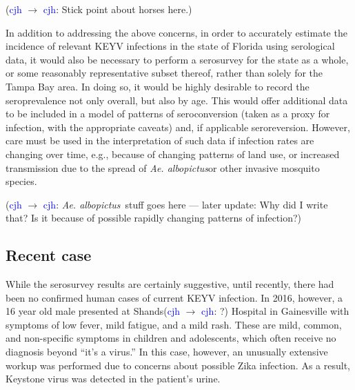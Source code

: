\documentclass[12pt]{article}
\newcommand{\alb}{\textit{Ae. albopictus}}
\newcommand{\cjh}{\textcolor{blue}{cjh}}
\newcommand{\msg}[3]{(#1 $\rightarrow$ #2: #3)}
\newcommand{\mcc}[1]{\msg\cjh\cjh{#1}}
\begin{document}
        \mcc{Stick point about horses here.}

        In addition to addressing the above concerns, in order to accurately estimate the incidence of relevant KEYV infections in the state of Florida using serological data, it would also be necessary to perform a serosurvey for the state as a whole, or some reasonably representative subset thereof, rather than solely for the Tampa Bay area. In doing so, it would be highly desirable to record the seroprevalence not only overall, but also by age. This would offer additional data to be included in a model of patterns of seroconversion (taken as a proxy for infection, with the appropriate caveats) and, if applicable seroreversion. However, care must be used in the interpretation of such data if infection rates are changing over time, e.g., because of changing patterns of land use, or increased transmission due to the spread of \alb or other invasive mosquito species.

        \mcc{\alb\ stuff goes here --- later update: Why did I write that? Is it because of possible rapidly changing patterns of infection?}

        \subsection{Recent case}
            While the serosurvey results are certainly suggestive, until recently, there had been no confirmed human cases of current KEYV infection. In 2016, however, a 16 year old male presented at Shands\mcc{?} Hospital in Gainesville with symptoms of low fever, mild fatigue, and a mild rash. These are mild, common, and non-specific symptoms in children and adolescents, which often receive no diagnosis beyond ``it's a virus.'' In this case, however, an unusually extensive workup was performed due to concerns about possible Zika infection. As a result, Keystone virus was detected in the patient's urine.\cite{asdf}
        
\end{document}

